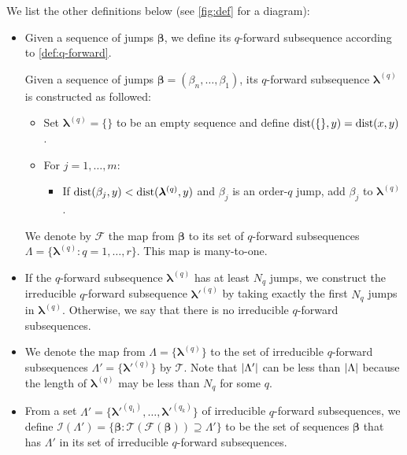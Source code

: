 We list the other definitions below (see \cref{fig:def} for a diagram):
\begin{itemize}
\item Given a sequence of jumps $\bm \beta$, we define its $q$-forward subsequence according to \cref{def:q-forward}.
\begin{definition}\label{def:q-forward}
Given a sequence of jumps $\bm \beta = (\beta_n,\dots,\beta_1)$, its $q$-forward subsequence $\bm \lambda^{(q)}$ is constructed as followed:
\begin{itemize}
	\item Set $\bm \lambda^{(q)} = \{\}$ to be an empty sequence and define $\textrm{dist}(\{\},y) = \textrm{dist}(x,y)$.
	\item For $j=1,\dots,m$:
	\begin{itemize}
		\item If $\textrm{dist}(\beta_j,y)<\textrm{dist}(\bm \lambda^{(q)},y)$ and $\beta_j$ is an order-$q$ jump, add $\beta_j$ to $\bm \lambda^{(q)}$.
	\end{itemize}
\end{itemize}
\end{definition}
We denote by $\mathcal F$ the map from $\bm \beta$ to its set of $q$-forward subsequences $\Lambda = \{\bm \lambda^{(q)}:q = 1,\dots,r\}$. This map is many-to-one.
\item If the $q$-forward subsequence $\bm \lambda^{(q)}$ has at least $N_q$ jumps, we construct the irreducible $q$-forward subsequence $\bm \lambda'^{(q)}$ by taking exactly the first $N_q$ jumps in $\bm \lambda^{(q)}$. Otherwise, we say that there is no irreducible $q$-forward subsequences.
\item
We denote the map from $\Lambda = \{\bm \lambda^{(q)}\}$ to the set of irreducible $q$-forward subsequences $\Lambda'=\{\bm \lambda'^{(q)}\}$ by $\mathcal T$.
Note that $\left | \Lambda' \right|$ can be less than $\left | \Lambda \right|$ because the length of $\bm \lambda^{(q)}$ may be less than $N_q$ for some $q$.
\item From a set $\Lambda' = \{\bm \lambda'^{(q_1)},\dots,\bm \lambda'^{(q_k)}\}$ of irreducible $q$-forward subsequences, we define $\mathcal I(\Lambda') = \{\bm\beta:\mathcal T(\mathcal F(\bm\beta) ) \supseteq \Lambda'\}$ to be the set of sequences $\bm \beta$ that has $\Lambda'$ in its set of irreducible $q$-forward subsequences.
\end{itemize}


